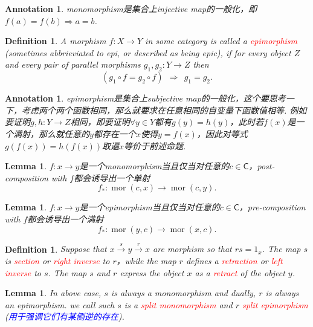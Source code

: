 \documentclass{article}
\newtheorem{lemma}[theorem]{Lemma}
\newtheorem{definition}[theorem]{Definition}
\newtheorem{annotation}[theorem]{Annotation}
\newcommand*{\cat}[1]{\textsf{#1}\xspace}
\newcommand{\id}{1}
\newcommand*{\xfunc}[4]{{#2}\colon{#3}{#1}{#4}}
\newcommand*{\func}[3]{\xfunc{\to}{#1}{#2}{#3}}
\DeclareMathOperator{\mor}{mor}
\newcommand{\redt}[1]{\textcolor{red}{#1}}
\newcommand{\bluet}[1]{\textcolor{blue}{#1}}
\begin{document}
\begin{annotation}
\rm monomorphism是集合上injective map的一般化，即$f(a) = f(b) \Rightarrow a = b$. 
\end{annotation}

\begin{definition}
\rm A morphism $\func{f}{X}{Y}$ in some category is called a \redt{epimorphism} (sometimes abbrieviated to epi, or described as being epic), if for every object $Z$ and every pair of parallel morphisms $\func{g_1,g_2}{Y}{Z}$ then
$$
(g_1 \circ f = g_2 \circ f)~~\Rightarrow~~ g_1 = g_2. 
$$
\end{definition}

\begin{annotation}
\rm epimorphism是集合上subjective map的一般化，这个要思考一下，考虑两个两个函数相同，那么就要求在任意相同的自变量下函数值相等. 例如要证明$\func{g,h}{Y}{Z}$相同，即要证明$\forall y \in Y$都有$g(y) = h(y)$，此时若$f(x)$是一个满射，那么就任意的$y$都存在一个$x$使得$y = f(x)$，因此对等式$g(f(x)) = h(f(x))$取遍$x$等价于前述命题.   
\end{annotation}

\begin{lemma}
\rm $\func{f}{x}{y}$是一个monomorphism当且仅当对任意的$c \in \cat{C}$，post-composition with $f$都会诱导出一个单射
$$
\func{f_*}{\mor(c,x)}{\mor(c,y)}.
$$
\end{lemma}

\begin{lemma}
\rm $\func{f}{x}{y}$是一个epimorphism当且仅当对任意的$c \in \cat{C}$，pre-composition with $f$都会诱导出一个满射
$$
\func{f_*}{\mor(y,c)}{\mor(x,c)}.
$$
\end{lemma}

\begin{definition}
\rm Suppose that $x \xrightarrow{s} y \xrightarrow{r} x$ are morphism so that $rs = \id_x$. The map $s$ is \redt{section} or \redt{right inverse} to $r$，while the map $r$ defines a \redt{retraction} or \redt{left inverse} to $s$. The map $s$ and $r$ express the object $x$ as a \redt{retract} of the object $y$.
\end{definition}

\begin{lemma}
\rm In above case, $s$ is always a monomorphism and dually, $r$ is always an epimorphism. we call such $s$ is a \redt{split monomorphism} and $r$ \redt{split epimorphism} (\bluet{用于强调它们有某侧逆的存在}). 
\end{lemma}
\end{document}
